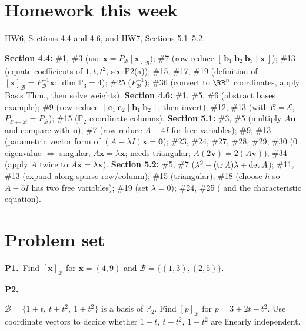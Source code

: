 \documentclass[10pt]{scrartcl}
\newcommand{\vv}[1]{\mathbf{#1}}
\begin{document}
\section{Homework this week}
HW6, Sections 4.4 and 4.6, and HW7, Sections 5.1--5.2.
\begin{itemize}
  \ii \textbf{Section 4.4:} \#1, \#3 (use $\vv x=P_{\mathcal B}[\vv x]_{\mathcal B}$); \#7 (row reduce $[\,\vv b_1\ \vv b_2\ \vv b_3\mid \vv x\,]$); \#13 (equate coefficients of $1,t,t^2$, see P2(a)); \#15, \#17, \#19 (definition of $[\vv x]_{\mathcal B}=P_{\mathcal B}^{-1}\vv x$; $\dim\mathbb P_3=4$); \#25 ($P_{\mathcal B}^{-1}$); \#36 (convert to $\RR^n$ coordinates, apply Basis Thm., then solve weights).
  \ii \textbf{Section 4.6:} \#1, \#5, \#6 (abstract bases example); \#9 (row reduce $[\,\vv c_1\ \vv c_2\mid \vv b_1\ \vv b_2\,]$, then invert); \#12, \#13 (with $\mathcal C=\mathcal E$, $P_{\mathcal E\leftarrow\mathcal B}=P_{\mathcal B}$); \#15 ($\mathbb P_2$ coordinate columns).
  \ii \textbf{Section 5.1:} \#3, \#5 (multiply $A\vv u$ and compare with $\vv u$); \#7 (row reduce $A-4I$ for free variables); \#9, \#13 (parametric vector form of $(A-\lambda I)\vv x=\vv 0$); \#23, \#24, \#27, \#28, \#29, \#30 ($0$ eigenvalue $\iff$ singular; $A\vv x=\lambda\vv x$;  needs triangular; $A(2\vv v)=2(A\vv v)$); \#34 (apply $A$ twice to $A\vv x=\lambda\vv x$).
  \ii \textbf{Section 5.2:} \#5, \#7 ($\lambda^2-(\operatorname{tr} A)\lambda+\det A$); \#11, \#13 (expand along sparse row/column); \#15 (triangular); \#18 (choose $h$ so $A-5I$ has two free variables); \#19 (set $\lambda=0$); \#24, \#25 ( and the characteristic equation).
\end{itemize}

\section{Problem set}

\begin{prob}
  \textbf{P1.}\ Find $[\vv x]_{\mathcal B}$ for $\vv x=(4,9)$ and $\mathcal B=\{(1,3),(2,5)\}$.
\end{prob}

\begin{prob}
  \textbf{P2.}\ \begin{enumerate}[(a)]
    \ii $\mathcal B=\{1+t,\ t+t^2,\ 1+t^2\}$ is a basis of $\mathbb P_2$. Find $[p]_{\mathcal B}$ for $p=3+2t-t^2$.
    \ii Use coordinate vectors to decide whether $1-t,\ t-t^2,\ 1-t^2$ are linearly independent.
  \end{enumerate}
\end{prob}
\end{document}
